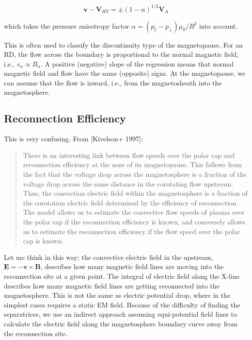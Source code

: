 \documentclass[
  notoc %
]{tufte-book}
\begin{document}
\[
\mathbf{v} - \mathbf{V}_{HT} = \pm(1-\alpha)^{1/2}\mathbf{V}_A
\]

which takes the pressure anisotropy factor
\(\alpha=(p_\parallel - p_\perp)\mu_0 / B^2\) into account.

This is often used to classify the discontinuity type of the
magnetopause. For an RD, the flow across the boundary is proportional to
the normal magnetic field, i.e., \(v_n \propto B_n\). A positive
(negative) slope of the regression means that normal magnetic field and
flow have the same (opposite) signs. At the magnetopause, we can assume
that the flow is inward, i.e., from the magnetosheath into the
magnetosphere.

\hypertarget{reconnection-efficiency}{%
\subsection{Reconnection Efficiency}\label{reconnection-efficiency}}

This is very confusing. From {[}Kivelson+ 1997{]}:

\begin{quote}
There is an interesting link between flow speeds over the polar cap and
reconnection efficiency at the nose of its magnetopause. This follows
from the fact that the voltage drop across the magnetosphere is a
fraction of the voltage drop across the same distance in the corotating
flow upstream. Thus, the convection electric field within the
magnetosphere is a fraction of the corotation electric field determined
by the efficiency of reconnection. The model allows us to estimate the
convective flow speeds of plasma over the polar cap if the reconnection
efficiency is known, and conversely allows us to estimate the
reconnection efficiency if the flow speed over the polar cap is known.
\end{quote}

Let me think in this way: the convective electric field in the upstream,
\(\mathbf{E}=-\mathbf{v}\times\mathbf{B}\), describes how many magnetic
field lines are moving into the reconnection site at a given point. The
integral of electric field along the X-line describes how many magnetic
field lines are getting reconnected into the magnetosphere. This is not
the same as electric potential drop, where in the simplest cases
requires a static EM field. Because of the difficulty of finding the
separatrices, we use an indirect approach assuming equi-potential field
lines to calculate the electric field along the magnetosphere boundary
curve away from the reconnection site.
\end{document}
